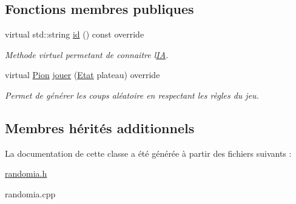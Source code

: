 \subsection*{Fonctions membres publiques}
\begin{DoxyCompactItemize}
\item 
virtual std\+::string \hyperlink{classRandomIA_a293e1635b96e7471cc105f0e421543db}{id} () const override\hypertarget{classRandomIA_a293e1635b96e7471cc105f0e421543db}{}\label{classRandomIA_a293e1635b96e7471cc105f0e421543db}

\begin{DoxyCompactList}\small\item\em Methode virtuel permetant de connaitre l\textquotesingle{}\hyperlink{classIA}{IA}. \end{DoxyCompactList}\item 
virtual \hyperlink{structPion}{Pion} \hyperlink{classRandomIA_a5e64b0d2e5ee8dcae31f4fbae8799dc3}{jouer} (\hyperlink{structEtat}{Etat} plateau) override\hypertarget{classRandomIA_a5e64b0d2e5ee8dcae31f4fbae8799dc3}{}\label{classRandomIA_a5e64b0d2e5ee8dcae31f4fbae8799dc3}

\begin{DoxyCompactList}\small\item\em Permet de générer les coups aléatoire en respectant les règles du jeu. \end{DoxyCompactList}\end{DoxyCompactItemize}
\subsection*{Membres hérités additionnels}


La documentation de cette classe a été générée à partir des fichiers suivants \+:\begin{DoxyCompactItemize}
\item 
\hyperlink{randomia_8h}{randomia.\+h}\item 
randomia.\+cpp\end{DoxyCompactItemize}

